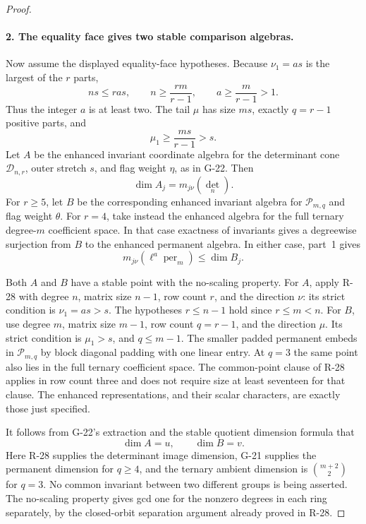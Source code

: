 \begin{proof}
\paragraph{2. The equality face gives two stable comparison algebras.}
Now assume the displayed equality-face hypotheses. Because
$\nu_1=as$ is the largest of the $r$ parts,
\[
 ns\le ras,\qquad
 n\ge\frac{rm}{r-1},\qquad
 a\ge\frac{m}{r-1}>1.
\]
Thus the integer $a$ is at least two. The tail $\mu$ has size
$ms$, exactly $q=r-1$ positive parts, and
\[
                    \mu_1\ge\frac{ms}{r-1}>s.
\]
Let $A$ be the enhanced invariant coordinate algebra for
the determinant cone $\mathcal D_{n,r}$, outer stretch $s$,
and flag weight $\eta$, as in G-22. Then
\[
                       \dim A_j=m_{j\nu}(\det_n).
\]
For $r\ge5$, let $B$ be the corresponding enhanced invariant
algebra for $\mathcal P_{m,q}$ and flag weight $\theta$.
For $r=4$, take instead the enhanced algebra for the full
ternary degree-$m$ coefficient space. In that case exactness
of invariants gives a degreewise surjection from $B$ to the
enhanced permanent algebra. In either case, part~1 gives
\begin{equation}\label{G26:degreewise_bound}
             m_{j\nu}(\ell^a\operatorname{per}_m)\le\dim B_j.
\end{equation}

Both $A$ and $B$ have a stable point with the no-scaling property.
For $A$, apply R-28 with degree $n$, matrix size $n-1$, row
count $r$, and the direction $\nu$: its strict condition is
$\nu_1=as>s$. The hypotheses $r\le n-1$ hold since
$r\le m<n$. For $B$, use degree $m$, matrix size $m-1$,
row count $q=r-1$, and the direction $\mu$. Its strict
condition is $\mu_1>s$, and $q\le m-1$.
The smaller padded permanent embeds in $\mathcal P_{m,q}$
by block diagonal padding with one linear entry. At $q=3$
the same point also lies in the full ternary coefficient space.
The common-point clause of R-28 applies in row count three
and does not require size at least seventeen for that clause.
The enhanced representations, and their scalar characters,
are exactly those just specified.

It follows from G-22's extraction and the stable quotient
dimension formula that
\[
                        \dim A=u,\qquad\dim B=v.
\]
Here R-28 supplies the determinant image dimension, G-21
supplies the permanent dimension for $q\ge4$, and the ternary
ambient dimension is $\binom{m+2}{2}$ for $q=3$.
No common invariant between two different groups is being
asserted. The no-scaling property gives gcd one for the
nonzero degrees in each ring separately, by the closed-orbit
separation argument already proved in R-28.


\end{proof}

